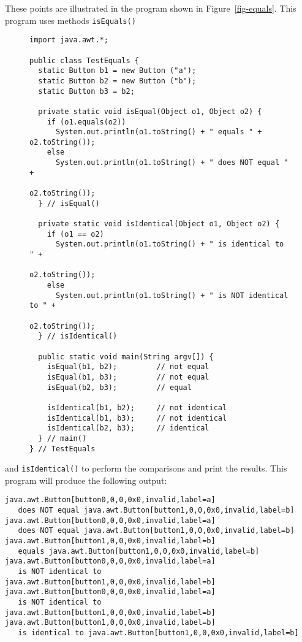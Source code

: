 These points are illustrated in the program shown in
Figure~\ref{fig-equals}. This program uses methods {\tt isEquals()}
\begin{figure}[h!]
\jjjprogstart
\begin{jjjlisting}[32pc]
\begin{lstlisting}
import java.awt.*;

public class TestEquals {
  static Button b1 = new Button ("a");
  static Button b2 = new Button ("b");
  static Button b3 = b2;

  private static void isEqual(Object o1, Object o2) {
    if (o1.equals(o2))
      System.out.println(o1.toString() + " equals " + o2.toString());
    else
      System.out.println(o1.toString() + " does NOT equal " + 
                                                      o2.toString());
  } // isEqual()

  private static void isIdentical(Object o1, Object o2) {
    if (o1 == o2)
      System.out.println(o1.toString() + " is identical to " + 
                                                      o2.toString());
    else
      System.out.println(o1.toString() + " is NOT identical to " + 
                                                      o2.toString());
  } // isIdentical()

  public static void main(String argv[]) {
    isEqual(b1, b2);         // not equal
    isEqual(b1, b3);         // not equal
    isEqual(b2, b3);         // equal

    isIdentical(b1, b2);     // not identical
    isIdentical(b1, b3);     // not identical
    isIdentical(b2, b3);     // identical
  } // main()
} // TestEquals
\end{lstlisting}
\end{jjjlisting}
\end{figure}
and {\tt isIdentical()} to perform the comparisons and print the
results. This program will produce the following output:

\begin{jjjlisting}[32pc]
\begin{lstlisting}
java.awt.Button[button0,0,0,0x0,invalid,label=a]
   does NOT equal java.awt.Button[button1,0,0,0x0,invalid,label=b]
java.awt.Button[button0,0,0,0x0,invalid,label=a]
   does NOT equal java.awt.Button[button1,0,0,0x0,invalid,label=b]
java.awt.Button[button1,0,0,0x0,invalid,label=b]
   equals java.awt.Button[button1,0,0,0x0,invalid,label=b]
java.awt.Button[button0,0,0,0x0,invalid,label=a]
   is NOT identical to java.awt.Button[button1,0,0,0x0,invalid,label=b]
java.awt.Button[button0,0,0,0x0,invalid,label=a]
   is NOT identical to java.awt.Button[button1,0,0,0x0,invalid,label=b]
java.awt.Button[button1,0,0,0x0,invalid,label=b]
   is identical to java.awt.Button[button1,0,0,0x0,invalid,label=b]
\end{lstlisting}
\end{jjjlisting}



